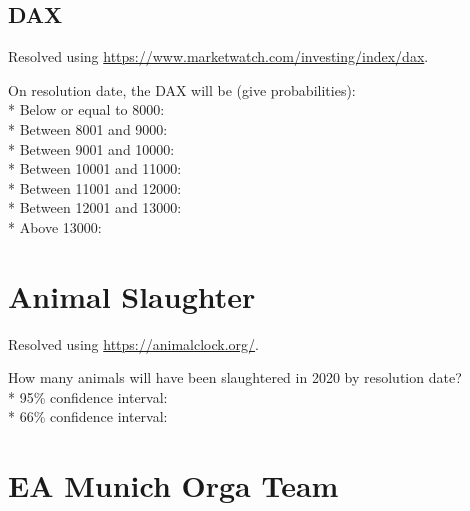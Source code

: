 \documentclass{article}
\begin{document}
\subsection*{DAX}

Resolved using
\href{https://www.marketwatch.com/investing/index/dax}{https://www.marketwatch.com/investing/index/dax}.

\vspace{0.3cm}

On resolution date, the DAX will be (give probabilities):\\*
Below or equal to 8000: \null\hfill\underline{\hspace{5cm}}\\*
Between 8001 and 9000: \null\hfill\underline{\hspace{5cm}}\\*
Between 9001 and 10000: \null\hfill\underline{\hspace{5cm}}\\*
Between 10001 and 11000: \null\hfill\underline{\hspace{5cm}}\\*
Between 11001 and 12000: \null\hfill\underline{\hspace{5cm}}\\*
Between 12001 and 13000: \null\hfill\underline{\hspace{5cm}}\\*
Above 13000: \null\hfill\underline{\hspace{5cm}}

\section*{Animal Slaughter}

Resolved using \href{https://animalclock.org/}{https://animalclock.org/}.

\vspace{0.3cm}

How many animals will have been slaughtered in 2020 by resolution date?\\*
95\% confidence interval: \null\hfill\underline{\hspace{8cm}}\\*
66\% confidence interval: \null\hfill\underline{\hspace{8cm}}

\section*{EA Munich Orga Team}
\end{document}
